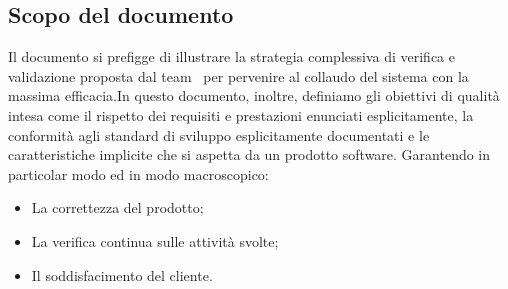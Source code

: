 \subsection{Scopo del documento}
Il documento si prefigge di illustrare la strategia complessiva di verifica e validazione proposta dal team \gruppo ~per pervenire al collaudo del sistema con la massima efficacia.In questo documento, inoltre, definiamo gli obiettivi di qualità intesa come il rispetto dei requisiti e prestazioni enunciati esplicitamente, la conformità agli standard di sviluppo esplicitamente documentati e le caratteristiche implicite che si aspetta da un prodotto software. Garantendo in particolar modo ed in modo macroscopico:
\begin{itemize}
\item La correttezza del prodotto;
\item La verifica continua sulle attività svolte;
\item Il soddisfacimento del cliente.
\end{itemize}